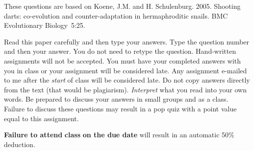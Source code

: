 \documentclass[12pt]{exam}
\begin{document}
These questions are based on Koene, J.M. and H. Schulenburg. 2005. Shooting darts: co-evolution and
counter-adaptation in hermaphroditic snails. BMC Evolutionary Biology~5:25.

Read this paper carefully and then type your answers. Type the question number and then your answer. You do not need to retype the question. Hand-written
assignments will not be accepted. You must have your completed answers
with you in class or your assignment will be considered late. Any
assignment e-mailed to me after the \emph{start} of class will be
considered late. Do not copy answers directly from the text (that would
be plagiarism). \emph{Interpret} what you read into your own words. Be
prepared to discuss your answers in small groups and as a class. Failure
to discuss these questions may result in a pop quiz with a point value
equal to this assignment.

\textbf{Failure to attend} \textbf{class} \textbf{on the due date} will
result in an automatic 50\% deduction.
\end{document}
